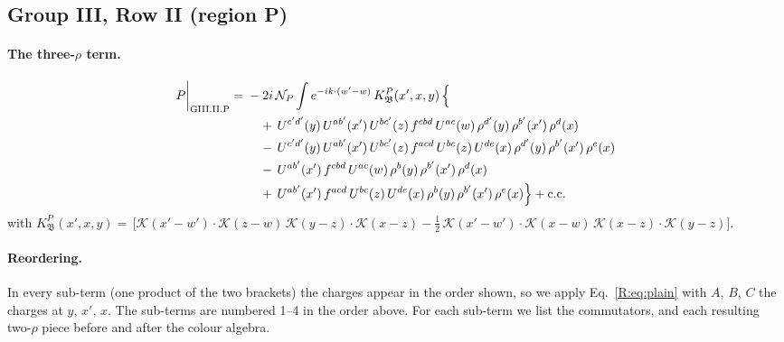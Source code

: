 \documentclass[10pt]{article}
\numberwithin{equation}{section}
\newcommand{\KK}{\mathcal K}
\newcommand{\NP}{\mathcal N_{P}}
\begin{document}
\subsection{Group III, Row II (region P)}\label{B:sec:GIII.II.P}

\paragraph{The three-$\rho$ term.}
\begin{align}
P\bigg|_{\rm GIII.II.P}={}&-2i\,\NP\int e^{-ik\cdot(w'-w)}\,K^{P}_{\mathfrak B}(x',x,y)\,\Big\{\notag\\
&\quad +\,U^{c'd'}(y)\,U^{ab'}(x')\,U^{bc'}(z)\,f^{cbd}\,U^{ac}(w)\,\rho^{d'}(y)\,\rho^{b'}(x')\,\rho^{d}(x)\notag\\
&\quad -\,U^{c'd'}(y)\,U^{ab'}(x')\,U^{bc'}(z)\,f^{acd}\,U^{bc}(z)\,U^{de}(x)\,\rho^{d'}(y)\,\rho^{b'}(x')\,\rho^{e}(x)\notag\\
&\quad -\,U^{ab'}(x')\,f^{cbd}\,U^{ac}(w)\,\rho^{b}(y)\,\rho^{b'}(x')\,\rho^{d}(x)\notag\\
&\quad +\,U^{ab'}(x')\,f^{acd}\,U^{bc}(z)\,U^{de}(x)\,\rho^{b}(y)\,\rho^{b'}(x')\,\rho^{e}(x)\Big\}+{\rm c.c.}\label{B:eq:in-GIII.II.P}
\end{align}
with $K^{P}_{\mathfrak B}(x',x,y)=\,\Big[\KK(x'-w')\cdot\KK(z-w)\,\KK(y-z)\cdot\KK(x-z)-\frac{1}{2}\,\KK(x'-w')\cdot\KK(x-w)\,\KK(x-z)\cdot\KK(y-z)\Big]$.
\paragraph{Reordering.} In every sub-term (one product of the two brackets) the charges appear in the order shown, so we apply Eq.~\eqref{R:eq:plain} with $A$, $B$, $C$ the charges at $y$, $x'$, $x$. The sub-terms are numbered 1--4 in the order above. For each sub-term we list the commutators, and each resulting two-$\rho$ piece before and after the colour algebra.
\end{document}
